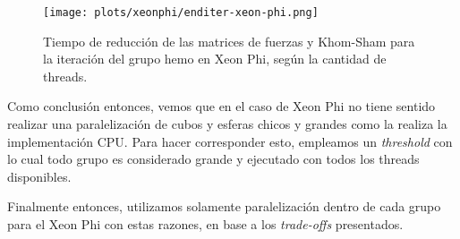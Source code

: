 \begin{figure}[htbp]
   \centering
   \texttt{[image: plots/xeonphi/enditer-xeon-phi.png]}
   \caption{Tiempo de reducci\'on de las matrices de fuerzas y Khom-Sham para
   la iteraci\'on del grupo hemo en Xeon Phi, seg\'un la cantidad de threads.}
   \label{fig:enditer-xeon-phi}
\end{figure}

Como conclusi\'on entonces, vemos que en el caso de Xeon Phi no tiene sentido
realizar una paralelizaci\'on de cubos y esferas chicos y grandes como la realiza
la implementaci\'on CPU. Para hacer corresponder esto, empleamos un \textit{threshold}
con lo cual todo grupo es considerado grande y ejecutado con todos los
threads disponibles.

Finalmente entonces, utilizamos solamente paralelizaci\'on dentro de cada grupo
para el Xeon Phi con estas razones, en base a los \textit{trade-offs} presentados.
